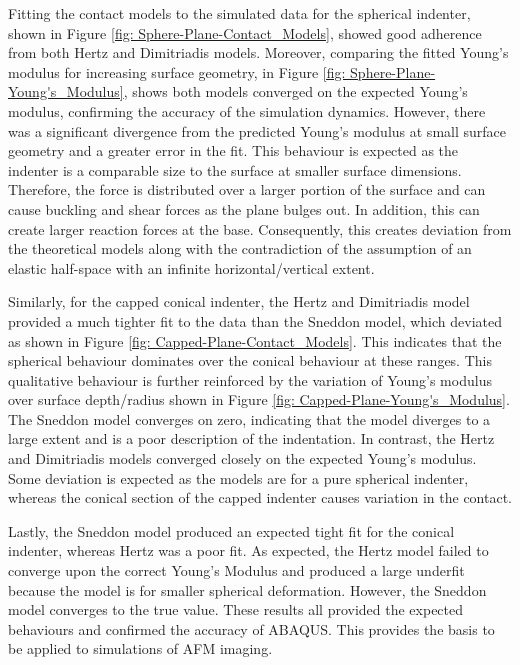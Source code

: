 Fitting the contact models to the simulated data for the spherical indenter, shown in Figure \ref{fig: Sphere-Plane-Contact_Models}, showed good adherence from both Hertz and Dimitriadis models. Moreover, comparing the fitted Young's modulus for increasing surface geometry, in Figure \ref{fig: Sphere-Plane-Young's_Modulus}, shows both models converged on the expected Young's modulus, confirming the accuracy of the simulation dynamics. However, there was a significant divergence from the predicted Young's modulus at small surface geometry and a greater error in the fit. This behaviour is expected as the indenter is a comparable size to the surface at smaller surface dimensions. Therefore, the force is distributed over a larger portion of the surface and can cause buckling and shear forces as the plane bulges out. In addition, this can create larger reaction forces at the base. Consequently, this creates deviation from the theoretical models along with the contradiction of the assumption of an elastic half-space with an infinite horizontal/vertical extent.

Similarly, for the capped conical indenter, the Hertz and Dimitriadis model provided a much tighter fit to the data than the Sneddon model, which deviated as shown in Figure \ref{fig: Capped-Plane-Contact_Models}. This indicates that the spherical behaviour dominates over the conical behaviour at these ranges. This qualitative behaviour is further reinforced by the variation of Young's modulus over surface depth/radius shown in Figure \ref{fig: Capped-Plane-Young's_Modulus}. The Sneddon model converges on zero, indicating that the model diverges to a large extent and is a poor description of the indentation. In contrast, the Hertz and Dimitriadis models converged closely on the expected Young's modulus. Some deviation is expected as the models are for a pure spherical indenter, whereas the conical section of the capped indenter causes variation in the contact. 

Lastly, the Sneddon model produced an expected tight fit for the conical indenter, whereas Hertz was a poor fit. As expected, the Hertz model failed to converge upon the correct Young's Modulus and produced a large underfit because the model is for smaller spherical deformation. However, the Sneddon model converges to the true value. These results all provided the expected behaviours and confirmed the accuracy of ABAQUS. This provides the basis to be applied to simulations of AFM imaging.